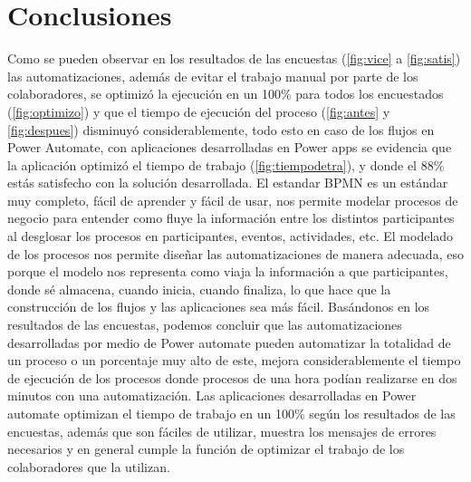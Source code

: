 \chapter{Conclusiones}

Como se pueden observar en los resultados de las encuestas (\ref{fig:vice} a \ref{fig:satis}) las automatizaciones, además de evitar el trabajo manual por parte de los colaboradores, se optimizó la ejecución en un 100\% para todos los encuestados (\ref{fig:optimizo}) y que el tiempo de ejecución del proceso (\ref{fig:antes} y \ref{fig:despues}) disminuyó considerablemente, todo esto en caso de los flujos en Power Automate, con aplicaciones desarrolladas en Power apps se evidencia que la aplicación optimizó el tiempo de trabajo (\ref{fig:tiempodetra}), y donde el 88\% estás satisfecho con la solución desarrollada.
\newline
El estandar BPMN es un estándar muy completo, fácil de aprender y fácil de usar, nos permite modelar procesos de negocio para entender como fluye la información entre los distintos participantes al desglosar los procesos en participantes, eventos, actividades, etc. El modelado de los procesos nos permite diseñar las automatizaciones de manera adecuada, eso porque el modelo nos representa como viaja la información a que participantes, donde sé almacena, cuando inicia, cuando finaliza, lo que hace que la construcción de los flujos y las aplicaciones sea más fácil.
\newline
Basándonos en los resultados de las encuestas, podemos concluir que las automatizaciones desarrolladas por medio de Power automate pueden automatizar la totalidad de un proceso o un porcentaje muy alto de este, mejora considerablemente el tiempo de ejecución de los procesos donde procesos de una hora podían realizarse en dos minutos con una automatización.
\newline
Las aplicaciones desarrolladas en Power automate optimizan el tiempo de trabajo en un 100\% según los resultados de las encuestas, además que son fáciles de utilizar, muestra los mensajes de errores necesarios y en general cumple la función de optimizar el trabajo de los colaboradores que la utilizan.